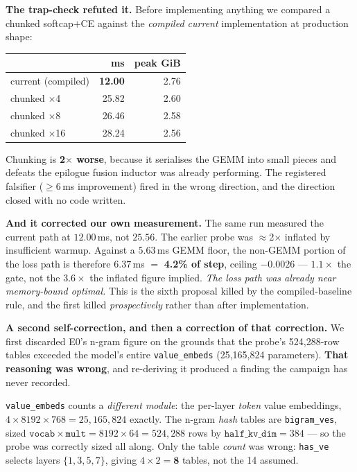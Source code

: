 \documentclass{article}
\begin{document}
\textbf{The trap-check refuted it.} Before implementing anything we compared a chunked softcap$+$CE against the \emph{compiled current} implementation at production shape:
\begin{center}\begin{small}
\begin{tabular}{lrr}
\toprule
 & ms & peak GiB \\
\midrule
current (compiled) & \textbf{12.00} & 2.76 \\
chunked $\times$4 & 25.82 & 2.60 \\
chunked $\times$8 & 26.46 & 2.58 \\
chunked $\times$16 & 28.24 & 2.56 \\
\bottomrule
\end{tabular}
\end{small}\end{center}
Chunking is \textbf{2$\times$ worse}, because it serialises the GEMM into small pieces and defeats the epilogue fusion inductor was already performing. The registered falsifier ($\ge$6\,ms improvement) fired in the wrong direction, and the direction closed with no code written.

\textbf{And it corrected our own measurement.} The same run measured the current path at $12.00$\,ms, not $25.56$. The earlier probe was $\approx$2$\times$ inflated by insufficient warmup. Against a $5.63$\,ms GEMM floor, the non-GEMM portion of the loss path is therefore $6.37$\,ms $=$ \textbf{4.2\% of step}, ceiling $-0.0026$ --- $1.1\times$ the gate, not the $3.6\times$ the inflated figure implied. \emph{The loss path was already near memory-bound optimal.} This is the sixth proposal killed by the compiled-baseline rule, and the first killed \emph{prospectively} rather than after implementation.

\textbf{A second self-correction, and then a correction of that correction.} We first discarded E0's n-gram figure on the grounds that the probe's 524{,}288-row tables exceeded the model's entire \texttt{value\_embeds} (25{,}165{,}824 parameters). \textbf{That reasoning was wrong}, and re-deriving it produced a finding the campaign has never recorded.

\texttt{value\_embeds} counts a \emph{different module}: the per-layer \emph{token} value embeddings, $4 \times 8192 \times 768 = 25{,}165{,}824$ exactly. The n-gram \emph{hash} tables are \texttt{bigram\_ves}, sized $\texttt{vocab}\times\texttt{mult} = 8192\times64 = 524{,}288$ rows by $\texttt{half\_kv\_dim}=384$ --- so the probe was correctly sized all along. Only the table \emph{count} was wrong: \texttt{has\_ve} selects layers $\{1,3,5,7\}$, giving $4\times2 = \mathbf{8}$ tables, not the 14 assumed.
\end{document}
